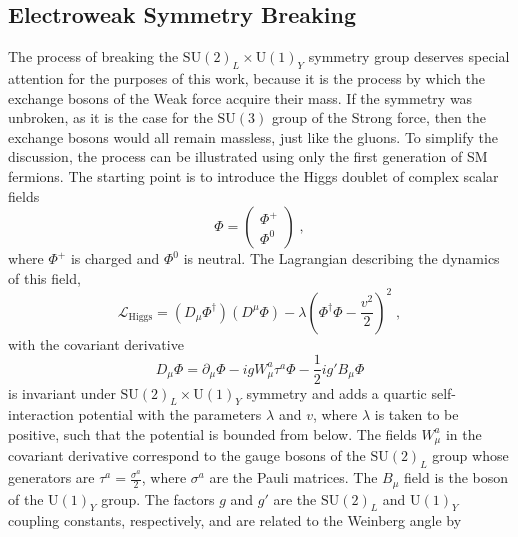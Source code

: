 \subsection{Electroweak Symmetry Breaking}
The process of breaking the $\mathrm{SU}(2)_L \times \mathrm{U}(1)_Y$ symmetry group deserves special attention for the purposes of this work, because it is the process by which the exchange bosons of the Weak force acquire their mass. If the symmetry was unbroken, as it is the case for the $\mathrm{SU(3)}$ group of the Strong force, then the exchange bosons would all remain massless, just like the gluons. To simplify the discussion, the process can be illustrated using only the first generation of SM fermions. The starting point is to introduce the Higgs doublet of complex scalar fields
\begin{equation}
    \Phi = \begin{pmatrix}
        \Phi^+ \\
        \Phi^0
    \end{pmatrix}\;,\label{eq:higgs-doublet}
\end{equation}
where $\Phi^+$ is charged and $\Phi^0$ is neutral. The Lagrangian describing the dynamics of this field,
\begin{equation}
    \mathcal{L}_\mathrm{Higgs} = (D_\mu \Phi^\dag)(D^\mu \Phi) - \lambda \left( \Phi^\dag \Phi - \frac{v^2}{2} \right)^2\;,\label{eq:higgs-lagrangian}
\end{equation}
with the covariant derivative
\begin{equation}
    D_\mu \Phi= \partial_\mu \Phi - ig W_\mu^a \tau^a \Phi - \frac{1}{2}ig'B_\mu \Phi
\end{equation}
is invariant under $\mathrm{SU}(2)_L \times \mathrm{U}(1)_Y$ symmetry and adds a quartic self-interaction potential with the parameters $\lambda$ and $v$, where $\lambda$ is taken to be positive, such that the potential is bounded from below. The fields $W_\mu^a$ in the covariant derivative correspond to the gauge bosons of the $\mathrm{SU}(2)_L$ group whose generators are $\tau^a = \frac{\sigma^a}{2}$, where $\sigma^a$ are the Pauli matrices. The $B_\mu$ field is the boson of the $\mathrm{U}(1)_Y$ group. The factors $g$ and $g'$ are the $\mathrm{SU}(2)_L$ and $\mathrm{U}(1)_Y$ coupling constants, respectively, and are related to the Weinberg angle by
